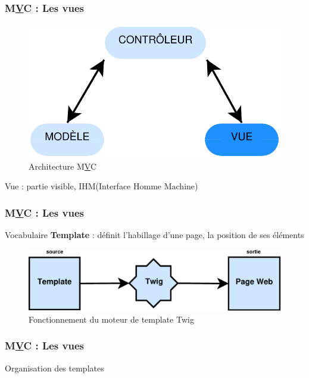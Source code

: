 \speaker{\Mathieu}

\begin{frame}
\frametitle{M\underline{V}C : Les vues}
\begin{figure}[!h]
	\begin{center}
	\includegraphics[scale=0.5]{images/mvcVue}
	\caption{Architecture M\underline{V}C}
	\end{center}
\end{figure}
Vue : partie visible, IHM(Interface Homme Machine)
\end{frame}

\begin{frame}
\frametitle{M\underline{V}C : Les vues}
\begin{block}{Vocabulaire}
\textbf{Template} : définit l'habillage d'une page, la position de ses éléments
\end{block}
\begin{figure}[!h]
	\begin{center}
	\includegraphics[scale=0.5]{images/twig}
	\caption{Fonctionnement du moteur de template Twig}
	\end{center}
\end{figure}
\end{frame}

\begin{frame}
\frametitle{M\underline{V}C : Les vues}
\begin{block}{Organisation des templates}

\end{block}
\end{frame}